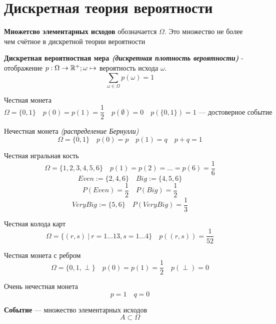 

\cfoot{}



\section{Дискретная теория вероятности}

\begin{definition}
    \textbf{Множетсво элементарных исходов} обозначается $\Omega$. Это множество не более чем счётное в дискретной теории вероятности
\end{definition}
\begin{definition}
    \textbf{Дискретная вероятностная мера \textit{(дискретная плотность вероятности)}} - отображение $p: \Omega \to \mathbb{R}^+; \omega\mapsto$ вероятность исхода $\omega$. $$\sum\limits_{\omega\in\Omega} p(\omega) = 1$$
\end{definition}
\begin{example}
    Честная монета
    $$\Omega = \{0, 1\} \quad p(0) = p(1) = \frac{1}{2} \quad p(\emptyset)=0 \quad p(\{0, 1\})=1 \text{ --- достоверное событие}$$
\end{example}
\begin{example}
    Нечестная монета \textit{(распределение Бернулли)}
    $$\Omega = \{0, 1\} \quad p(0) = p \quad p(1) = q \quad p + q = 1$$
\end{example}
\begin{example}
    Честная игральная кость
    $$\Omega = \{1, 2, 3, 4, 5, 6\} \quad p(1) = p(2) = \ldots = p(6) = \frac{1}{6}$$
    $$Even := \{2, 4, 6\} \quad Big := \{4, 5, 6\}$$
    $$P(Even) = \frac{1}{2} \quad P(Big) = \frac{1}{2}$$
    $$VeryBig := \{5, 6\} \quad P(VeryBig) = \frac{1}{3}$$
\end{example}
\begin{example}
    Честная колода карт
    $$\Omega = \{(r, s)\ |\ r=1\ldots13, s=1\ldots4\} \quad p((r, s))=\frac{1}{52}$$
\end{example}
\begin{example}
    Честная монета с ребром
    $$\Omega = \{0, 1, \perp\} \quad p(0) = p(1) = \frac{1}{2} \quad p(\perp) = 0$$
\end{example}
\begin{example}
    Очень нечестная монета
    $$p = 1 \quad q = 0$$
\end{example}
\begin{definition}
    \textbf{Событие} --- множество элементарных исходов
    $$A\subset\Omega$$
\end{definition}
